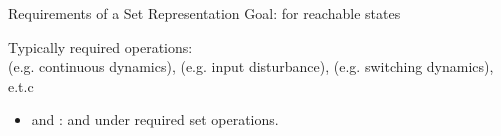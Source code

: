 \begin{frame}{Requirements of a Set Representation}
%
Goal:  for  reachable states
%
%

\bigskip
Typically required operations:\\
 (e.g. continuous dynamics),  (e.g. input disturbance),  (e.g. switching dynamics), e.t.c
%
\vspace{2em}
\begin{itemize}
\item {} and : 
  and  under required set operations.
\vspace{1em}

\end{itemize}
\end{frame}


